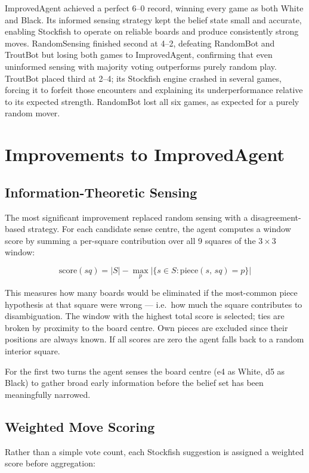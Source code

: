 \documentclass{article}
\begin{document}
ImprovedAgent achieved a perfect 6--0 record, winning every game as both White and
Black. Its informed sensing strategy kept the belief state small and accurate, enabling
Stockfish to operate on reliable boards and produce consistently strong moves.
RandomSensing finished second at 4--2, defeating RandomBot and TroutBot but losing
both games to ImprovedAgent, confirming that even uninformed sensing with majority
voting outperforms purely random play. TroutBot placed third at 2--4; its Stockfish
engine crashed in several games, forcing it to forfeit those encounters and explaining
its underperformance relative to its expected strength. RandomBot lost all six games,
as expected for a purely random mover.

\section{Improvements to ImprovedAgent}

\subsection{Information-Theoretic Sensing}

The most significant improvement replaced random sensing with a disagreement-based
strategy. For each candidate sense centre, the agent computes a window score by
summing a per-square contribution over all 9 squares of the $3{\times}3$ window:

\[
  \text{score}(sq) = |S| - \max_{p} \bigl|\{s \in S : \text{piece}(s,\, sq) = p\}\bigr|
\]

This measures how many boards would be eliminated if the most-common piece hypothesis
at that square were wrong — i.e.\ how much the square contributes to disambiguation.
The window with the highest total score is selected; ties are broken by proximity to
the board centre. Own pieces are excluded since their positions are always known. If
all scores are zero the agent falls back to a random interior square.

For the first two turns the agent senses the board centre (e4 as White, d5 as Black)
to gather broad early information before the belief set has been meaningfully narrowed.

\subsection{Weighted Move Scoring}

Rather than a simple vote count, each Stockfish suggestion is assigned a weighted score
before aggregation:
\end{document}
